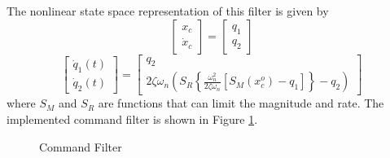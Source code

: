 The nonlinear state space representation of this filter is given by
\begin{equation}\label{key}
\begin{bmatrix}
x_c\\
\dot{x}_c
\end{bmatrix}
=
\begin{bmatrix}
q_1\\
q_2
\end{bmatrix}
\end{equation}
\begin{equation}\label{key}
\begin{bmatrix}
\dot{q}_1(t)\\
\dot{q}_2(t)
\end{bmatrix}
=
\begin{bmatrix}
q_2\\
2\zeta\omega_n\left( S_R\left\lbrace \frac{\omega_n^2}{2\zeta\omega_n}\left[ S_M(x_c^o)-q_1\right] \right\rbrace-q_2 \right) 
\end{bmatrix}
\end{equation}
where $ S_M $ and $ S_R $ are functions that can limit the magnitude and rate. The implemented command filter is shown in Figure \ref{fig:set.cf}.
\begin{figure}[h!]
	\centering
	\caption{Command Filter\label{fig:set.cf}}
\end{figure}


